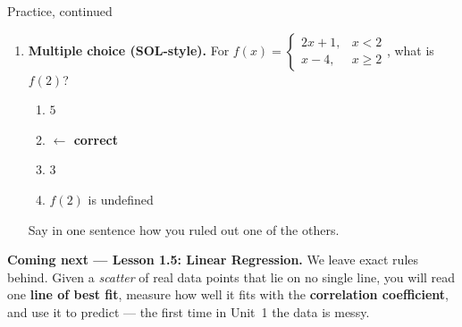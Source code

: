 \documentclass[12pt]{article}
\begin{document}
\begin{notesbox}{Practice, continued}
\begin{enumerate}[leftmargin=1.9em, itemsep=8pt, start=4]
  \item \textbf{Multiple choice (SOL-style).} For
        $f(x)=\begin{cases} 2x+1, & x<2 \\ x-4, & x\ge2 \end{cases}$, what is $f(2)$?
    \begin{enumerate}[label=\Alph*., leftmargin=2.2em, itemsep=1pt]
      \item {}$5$
      \item {} \hfill \textcolor{keyred}{\textbf{$\leftarrow$ correct}}
      \item $3$
      \item $f(2)$ is undefined
    \end{enumerate}
    Say in one sentence how you ruled out one of the others.
\end{enumerate}
\end{notesbox}

\vspace{0.10in}

\boxguard[8]
\begin{spiralbox}
\small
\textbf{Coming next --- Lesson 1.5: Linear Regression.} We leave exact rules behind. Given a
\emph{scatter} of real data points that lie on no single line, you will read one \textbf{line of
best fit}, measure how well it fits with the \textbf{correlation coefficient}, and use it to
predict --- the first time in Unit~1 the data is messy.
\end{spiralbox}
\end{document}
